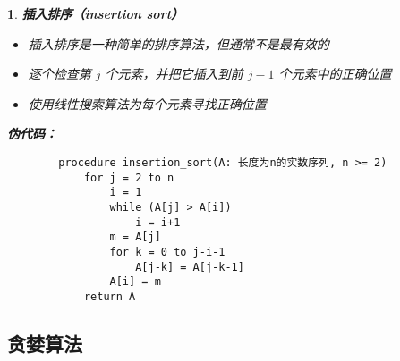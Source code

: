\documentclass[UTF8]{report}
\theoremstyle{MyLineTheoremStyle} %
\theoremstyle{MyBlockTheoremStyle} %
\theoremstyle{MySubsubsectionStyle} %
\newtheorem{definition}{}
\begin{document}
\begin{definition}
    \textbf{插入排序（insertion sort）}\par
    \begin{itemize}
        \item 插入排序是一种简单的排序算法，但通常不是最有效的
        \item 逐个检查第 $j$ 个元素，并把它插入到前 $j-1$ 个元素中的正确位置
        \item 使用线性搜索算法为每个元素寻找正确位置
    \end{itemize}

    \textbf{伪代码：}\par
    \begin{verbatim}
        procedure insertion_sort(A: 长度为n的实数序列, n >= 2)
            for j = 2 to n
                i = 1
                while (A[j] > A[i])
                    i = i+1
                m = A[j]
                for k = 0 to j-i-1
                    A[j-k] = A[j-k-1]
                A[i] = m
            return A
    \end{verbatim}
\end{definition}

\subsection{贪婪算法}
\end{document}
